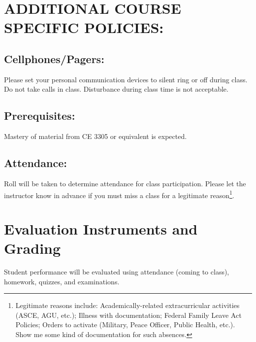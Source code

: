 \documentclass[12pt]{article}
\begin{document}
\section*{ADDITIONAL COURSE SPECIFIC POLICIES:}
\subsection*{Cellphones/Pagers: }
Please set your personal communication devices to silent ring or off during class. Do not take calls in class. Disturbance during class time is not acceptable.
\subsection*{Prerequisites:} 
Mastery of material from CE 3305 or equivalent is expected.
\subsection*{Attendance:} Roll will be taken to determine attendance for class participation.  Please let the instructor know in advance if you must miss a class for a legitimate reason\footnote{Legitimate reasons include: Academically-related extracurricular activities (ASCE, AGU, etc.); Illness with documentation; Federal Family Leave Act Policies; Orders to activate (Military, Peace Officer, Public Health, etc.).  Show me some kind of documentation for such absences.}. 

\section*{Evaluation Instruments and Grading}
Student performance will be evaluated using attendance (coming to class), homework, quizzes, and examinations.   %

\end{document}

